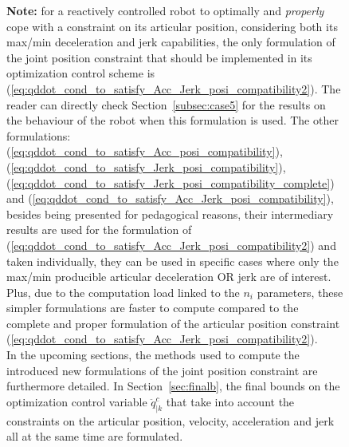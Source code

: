 \begin{figure}[!htbp]
\textbf{Note:} for a reactively controlled robot to optimally and \textit{properly} cope with a constraint on its articular position, considering both its max/min deceleration and jerk capabilities, the only formulation of the joint position constraint that should be implemented in its optimization control scheme is (\ref{eq:qddot_cond_to_satisfy_Acc_Jerk_posi_compatibility2}). The reader can directly check Section~\ref{subsec:case5} for the results on the behaviour of the robot when this formulation is used. The other formulations: (\ref{eq:qddot_cond_to_satisfy_Acc_posi_compatibility}), (\ref{eq:qddot_cond_to_satisfy_Jerk_posi_compatibility}), (\ref{eq:qddot_cond_to_satisfy_Jerk_posi_compatibility_complete}) and (\ref{eq:qddot_cond_to_satisfy_Acc_Jerk_posi_compatibility}), besides being presented for pedagogical reasons, their intermediary results are used for the formulation of (\ref{eq:qddot_cond_to_satisfy_Acc_Jerk_posi_compatibility2}) and taken individually, they can be used in specific cases where only the max/min producible articular deceleration OR jerk are of interest. Plus, due to the computation load linked to the $n_i$ parameters, these simpler formulations are faster to compute compared to the complete and proper formulation of the articular position constraint (\ref{eq:qddot_cond_to_satisfy_Acc_Jerk_posi_compatibility2}). \\

In the upcoming sections, the methods used to compute the introduced new formulations of the joint position constraint are furthermore detailed. In Section~\ref{sec:finalb}, the final bounds on the optimization control variable $\ddot{q}_{|k}^c$ that take into account the constraints on the articular position, velocity, acceleration and jerk all at the same time are formulated.

\end{figure}
